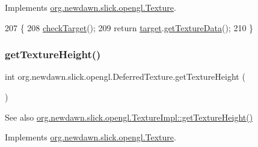 Implements \mbox{\hyperlink{interfaceorg_1_1newdawn_1_1slick_1_1opengl_1_1_texture_a84c7714d8bdd0e4a933a95ae33531ad7}{org.\+newdawn.\+slick.\+opengl.\+Texture}}.


\begin{DoxyCode}
207                                    \{
208         \mbox{\hyperlink{classorg_1_1newdawn_1_1slick_1_1opengl_1_1_deferred_texture_a22f14bcd9cbd4bf033e2308b90464dce}{checkTarget}}();
209         \textcolor{keywordflow}{return} \mbox{\hyperlink{classorg_1_1newdawn_1_1slick_1_1opengl_1_1_deferred_texture_aa70a4b195d0b965a0099d0e7bc18d9d2}{target}}.\mbox{\hyperlink{classorg_1_1newdawn_1_1slick_1_1opengl_1_1_texture_impl_a1420a28b8b562c79d6053c927cc58f20}{getTextureData}}();
210     \}
\end{DoxyCode}
\mbox{\label{classorg_1_1newdawn_1_1slick_1_1opengl_1_1_deferred_texture_a71d22424b36651006e822d715c97ea73}} 
\subsubsection{\texorpdfstring{get\+Texture\+Height()}{getTextureHeight()}}
{\footnotesize\ttfamily int org.\+newdawn.\+slick.\+opengl.\+Deferred\+Texture.\+get\+Texture\+Height (\begin{DoxyParamCaption}{ }\end{DoxyParamCaption})\hspace{0.3cm}{\ttfamily [inline]}}

\begin{DoxySeeAlso}{See also}
\mbox{\hyperlink{classorg_1_1newdawn_1_1slick_1_1opengl_1_1_texture_impl_ad3ab4017a31fb25922ee51990acb2231}{org.\+newdawn.\+slick.\+opengl.\+Texture\+Impl\+::get\+Texture\+Height()}} 
\end{DoxySeeAlso}


Implements \mbox{\hyperlink{interfaceorg_1_1newdawn_1_1slick_1_1opengl_1_1_texture_a6626d0905e80214b320fb0042ad0e98d}{org.\+newdawn.\+slick.\+opengl.\+Texture}}.


